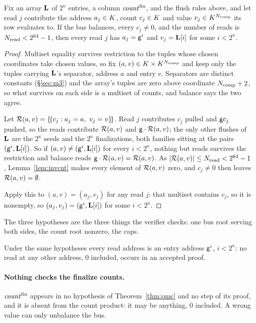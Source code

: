 \begin{theorem}\label{thm:omc}
Fix an array $\mathbf{L}$ of $2^{\kappa}$ entries, a column $\mathit{count}^{\mathrm{fin}}$, and the flush rules above, and let read $j$ contribute the address $a_j\in K$, count $c_j\in K$ and value $v_j\in K^{N_{\mathrm{comp}}}$ its row evaluates to. If the bus balances, every $c_j\neq0$, and the number of reads is $N_{\mathrm{read}}<2^{64}-1$, then every read $j$ has $a_j=\mathsf{g}^{i}$ and $v_j=\mathbf{L}[i]$ for some $i<2^{\kappa}$.
\end{theorem}

\begin{proof}
Multiset equality survives restriction to the tuples whose chosen coordinates take chosen values, so fix $(a,v)\in K\times K^{N_{\mathrm{comp}}}$ and keep only the tuples carrying $\mathbf{L}$'s separator, address $a$ and entry $v$. Separators are distinct constants (\S\ref{sec:m3}) and the array's tuples are zero above coordinate $N_{\mathrm{comp}}+2$, so what survives on each side is a multiset of counts, and balance says the two agree.

Let $\rcnts(a,v)=\mset{c_j:a_j=a,\ v_j=v}$. Read $j$ contributes $c_j$ pulled and $\mathsf{g} c_j$ pushed, so the reads contribute $\mathcal{R}(a,v)$ and $\mathsf{g}\cdot\mathcal{R}(a,v)$; the only other flushes of $\mathbf{L}$ are the $2^{\kappa}$ seeds and the $2^{\kappa}$ finalizations, both families sitting at the pairs $(\mathsf{g}^{i},\mathbf{L}[i])$. So if $(a,v)\neq(\mathsf{g}^{i},\mathbf{L}[i])$ for every $i<2^{\kappa}$, nothing but reads survives the restriction and balance reads $\mathsf{g}\cdot\mathcal{R}(a,v)=\mathcal{R}(a,v)$. As $|\mathcal{R}(a,v)|\le N_{\mathrm{read}}<2^{64}-1$, Lemma~\ref{lem:invcnt} makes every element of $\mathcal{R}(a,v)$ zero, and $c_j\neq0$ then leaves $\mathcal{R}(a,v)=\emptyset$.

Apply this to $(a,v)=(a_j,v_j)$ for any read $j$: that multiset contains $c_j$, so it is nonempty, so $(a_j,v_j)=(\mathsf{g}^{i},\mathbf{L}[i])$ for some $i<2^{\kappa}$.
\end{proof}

The three hypotheses are the three things the verifier checks: one bus root serving both sides, the count root nonzero, the caps.

\begin{corollary}\label{cor:addrrange}
Under the same hypotheses every read address is an entry address $\mathsf{g}^{i}$, $i<2^{\kappa}$: no read at any other address, $0$ included, occurs in an accepted proof.
\end{corollary}

\paragraph{Nothing checks the finalize counts.} $\mathit{count}^{\mathrm{fin}}$ appears in no hypothesis of Theorem~\ref{thm:omc} and no step of its proof, and it is absent from the count product: it may be anything, $0$ included. A wrong value can only unbalance the bus.

